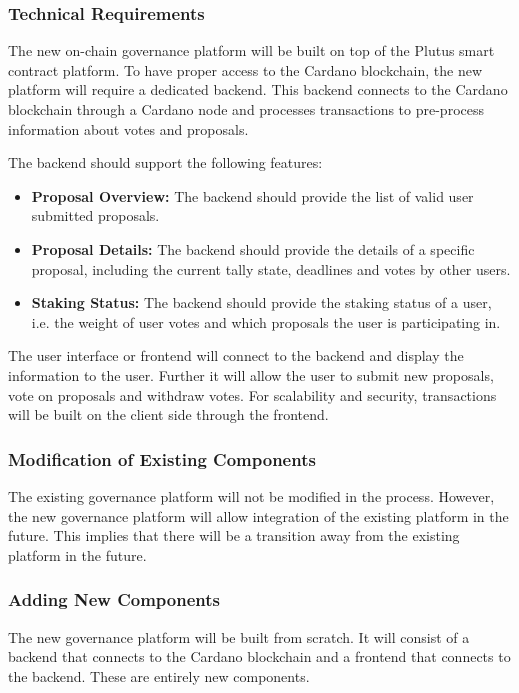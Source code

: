 \documentclass[11pt]{article}
\begin{document}
\subsubsection{Technical Requirements}

The new on-chain governance platform will be built on top of the Plutus smart contract platform.
To have proper access to the Cardano blockchain, the new platform will require a dedicated backend.
This backend connects to the Cardano blockchain through a Cardano node and processes transactions
to pre-process information about votes and proposals.

The backend should support the following features:
\begin{itemize}
    \item \textbf{Proposal Overview:} The backend should provide the list of valid user submitted proposals.
    \item \textbf{Proposal Details:} The backend should provide the details of a specific proposal, including the current tally state, deadlines and votes by other users.
    \item \textbf{Staking Status:} The backend should provide the staking status of a user, i.e. the weight of user votes and which proposals the user is participating in.
\end{itemize}

The user interface or frontend will connect to the backend and display the information to the user.
Further it will allow the user to submit new proposals, vote on proposals and withdraw votes.
For scalability and security, transactions will be built on the client side through the frontend.

\subsubsection{Modification of Existing Components}

The existing governance platform will not be modified in the process.
However, the new governance platform will allow integration of the existing platform in the future.
This implies that there will be a transition away from the existing platform in the future.


\subsubsection{Adding New Components}

The new governance platform will be built from scratch.
It will consist of a backend that connects to the Cardano blockchain and a frontend that connects to the backend.
These are entirely new components.
\end{document}
